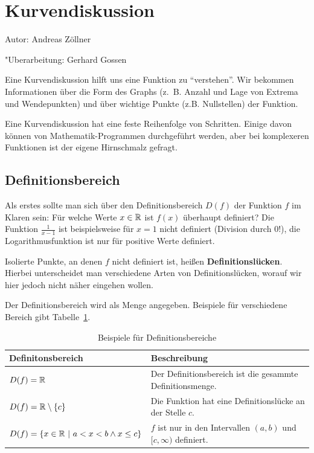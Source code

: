 

\section{Kurvendiskussion}
\label{sec:kurvendiskussion}

Autor: Andreas Zöllner

\noindent "Uberarbeitung: Gerhard Gossen

\mbox{}\par

\noindent Eine Kurvendiskussion hilft uns eine Funktion zu "`verstehen"'. Wir bekommen Informationen über die Form des Graphs (z.~B. Anzahl und Lage von Extrema und Wendepunkten) und über wichtige Punkte (z.B. Nullstellen) der Funktion.

\noindent Eine Kurvendiskussion hat eine feste Reihenfolge von Schritten. Einige davon können von Mathematik-Programmen durchgeführt werden, aber bei komplexeren Funktionen ist der eigene Hirnschmalz gefragt.

\subsection{Definitionsbereich}

Als erstes sollte man sich über den Definitionsbereich $D(f)$ der Funktion $f$
im Klaren sein: Für welche Werte $x\in\mathbb{R}$ ist $f(x)$ überhaupt definiert? Die Funktion $\frac{1}{x-1}$ ist beispielsweise für $x=1$ nicht definiert (Division durch 0!), die Logarithmusfunktion ist nur für positive Werte definiert. 

\noindent Isolierte Punkte, an denen $f$ nicht definiert ist, heißen
\textbf{Definitionslücken}. Hierbei unterscheidet man verschiedene Arten von
Definitionslücken, worauf wir hier jedoch nicht näher eingehen wollen.

\noindent Der Definitionsbereich wird als Menge angegeben. Beispiele für verschiedene Bereich gibt Tabelle~\ref{tab:definitionsbereiche}.

\begin{table}[b]
\begin{tabular}{l|p{13em}}
\textbf{Definitonsbereich} & \textbf{Beschreibung}\\
\hline
$D(f) = \mathbb{R}$ & Der Definitionsbereich ist die gesammte Definitionsmenge.\\
$D(f) = \mathbb{R} \setminus \{c\}$ & Die Funktion hat eine Definitionslücke an der Stelle $c$.\\
$D(f) = \{x\in\mathbb{R}\ |\ a < x < b \wedge x\leq c\}$ & $f$ ist nur in den Intervallen $(a,b)$ und $[c,\infty)$ definiert.
\end{tabular}
\vspace{-1em}
\caption{Beispiele für Definitionsbereiche}
\label{tab:definitionsbereiche}
\end{table}



